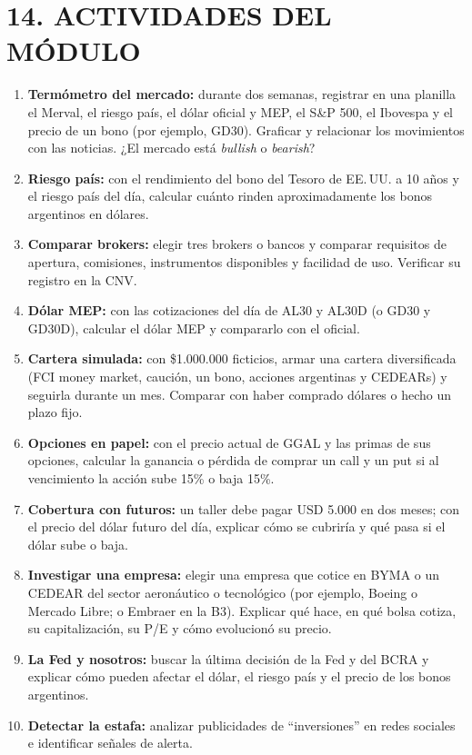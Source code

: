 \section*{14. ACTIVIDADES DEL MÓDULO}

\begin{enumerate}
  \item \textbf{Termómetro del mercado:} durante dos semanas, registrar en una planilla el
        Merval, el riesgo país, el dólar oficial y MEP, el S\&P 500, el Ibovespa y el precio de
        un bono (por ejemplo, GD30). Graficar y relacionar los movimientos con las noticias.
        ¿El mercado está \textit{bullish} o \textit{bearish}?
  \item \textbf{Riesgo país:} con el rendimiento del bono del Tesoro de EE.\,UU. a 10 años y el
        riesgo país del día, calcular cuánto rinden aproximadamente los bonos argentinos en
        dólares.
  \item \textbf{Comparar brokers:} elegir tres brokers o bancos y comparar requisitos de apertura,
        comisiones, instrumentos disponibles y facilidad de uso. Verificar su registro en la CNV.
  \item \textbf{Dólar MEP:} con las cotizaciones del día de AL30 y AL30D (o GD30 y GD30D),
        calcular el dólar MEP y compararlo con el oficial.
  \item \textbf{Cartera simulada:} con \$1.000.000 ficticios, armar una cartera diversificada
        (FCI money market, caución, un bono, acciones argentinas y CEDEARs) y seguirla durante
        un mes. Comparar con haber comprado dólares o hecho un plazo fijo.
  \item \textbf{Opciones en papel:} con el precio actual de GGAL y las primas de sus opciones,
        calcular la ganancia o pérdida de comprar un call y un put si al vencimiento la acción
        sube 15\% o baja 15\%.
  \item \textbf{Cobertura con futuros:} un taller debe pagar USD 5.000 en dos meses; con el precio
        del dólar futuro del día, explicar cómo se cubriría y qué pasa si el dólar sube o baja.
  \item \textbf{Investigar una empresa:} elegir una empresa que cotice en BYMA o un CEDEAR del
        sector aeronáutico o tecnológico (por ejemplo, Boeing o Mercado Libre; o Embraer en la
        B3). Explicar qué hace, en qué bolsa cotiza, su capitalización, su P/E y cómo evolucionó
        su precio.
  \item \textbf{La Fed y nosotros:} buscar la última decisión de la Fed y del BCRA y explicar
        cómo pueden afectar el dólar, el riesgo país y el precio de los bonos argentinos.
  \item \textbf{Detectar la estafa:} analizar publicidades de ``inversiones'' en redes sociales
        e identificar señales de alerta.
\end{enumerate}
